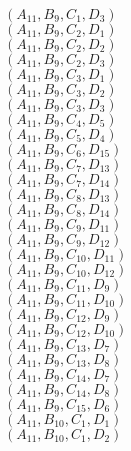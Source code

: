 \documentclass[14pt]{article}
\begin{document}
    $({A}_{11}, {B}_{9}, {C}_{1}, {D}_{3}) $ \\ 
    $({A}_{11}, {B}_{9}, {C}_{2}, {D}_{1}) $ \\ 
    $({A}_{11}, {B}_{9}, {C}_{2}, {D}_{2}) $ \\ 
    $({A}_{11}, {B}_{9}, {C}_{2}, {D}_{3}) $ \\ 
    $({A}_{11}, {B}_{9}, {C}_{3}, {D}_{1}) $ \\ 
    $({A}_{11}, {B}_{9}, {C}_{3}, {D}_{2}) $ \\ 
    $({A}_{11}, {B}_{9}, {C}_{3}, {D}_{3}) $ \\ 
    $({A}_{11}, {B}_{9}, {C}_{4}, {D}_{5}) $ \\ 
    $({A}_{11}, {B}_{9}, {C}_{5}, {D}_{4}) $ \\ 
    $({A}_{11}, {B}_{9}, {C}_{6}, {D}_{15}) $ \\ 
    $({A}_{11}, {B}_{9}, {C}_{7}, {D}_{13}) $ \\ 
    $({A}_{11}, {B}_{9}, {C}_{7}, {D}_{14}) $ \\ 
    $({A}_{11}, {B}_{9}, {C}_{8}, {D}_{13}) $ \\ 
    $({A}_{11}, {B}_{9}, {C}_{8}, {D}_{14}) $ \\ 
    $({A}_{11}, {B}_{9}, {C}_{9}, {D}_{11}) $ \\ 
    $({A}_{11}, {B}_{9}, {C}_{9}, {D}_{12}) $ \\ 
    $({A}_{11}, {B}_{9}, {C}_{10}, {D}_{11}) $ \\ 
    $({A}_{11}, {B}_{9}, {C}_{10}, {D}_{12}) $ \\ 
    $({A}_{11}, {B}_{9}, {C}_{11}, {D}_{9}) $ \\ 
    $({A}_{11}, {B}_{9}, {C}_{11}, {D}_{10}) $ \\ 
    $({A}_{11}, {B}_{9}, {C}_{12}, {D}_{9}) $ \\ 
    $({A}_{11}, {B}_{9}, {C}_{12}, {D}_{10}) $ \\ 
    $({A}_{11}, {B}_{9}, {C}_{13}, {D}_{7}) $ \\ 
    $({A}_{11}, {B}_{9}, {C}_{13}, {D}_{8}) $ \\ 
    $({A}_{11}, {B}_{9}, {C}_{14}, {D}_{7}) $ \\ 
    $({A}_{11}, {B}_{9}, {C}_{14}, {D}_{8}) $ \\ 
    $({A}_{11}, {B}_{9}, {C}_{15}, {D}_{6}) $ \\ 
    $({A}_{11}, {B}_{10}, {C}_{1}, {D}_{1}) $ \\ 
    $({A}_{11}, {B}_{10}, {C}_{1}, {D}_{2}) $ \\ 
\end{document}
